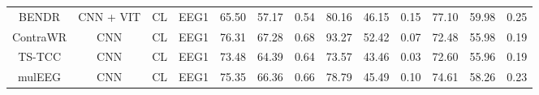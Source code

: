 \begin{table*}[!htbp]
{{\begin{tabular}{c|c|c|c|ccc|ccc|ccc}
\hline
BENDR \cite{ref15}                                                                                  & CNN + VIT                                                                                         & CL                                                                                                      & EEG1                                & 65.50          & 57.17          & 0.54                                                                     & 80.16          & 46.15          & 0.15                                                          & 77.10          & 59.98          & 0.25                                                              \\
ContraWR \cite{ref16}                                                                              & CNN                                                                                               & CL                                                                                                      & EEG1                                & 76.31          & 67.28          & 0.68                                                                     & 93.27          & 52.42          & 0.07                                                          & 72.48          & 55.98          & 0.19                                                              \\
TS-TCC \cite{ref17}                                                                                & CNN                                                                                               & CL                                                                                                      & EEG1                                & 73.48          & 64.39          & 0.64                                                                     & 73.57          & 43.46          & 0.03                                                          & 72.60          & 55.96          & 0.19                                                              \\
mulEEG \cite{ref18}                                                                                & CNN                                                                                               & CL                                                                                                      & EEG1                                & 75.35          & 66.36          & 0.66                                                                     & 78.79          & 45.49          & 0.10                                                          & 74.61          & 58.26          & 0.23                                                              \\

\end{tabular}}}
\end{table*}
